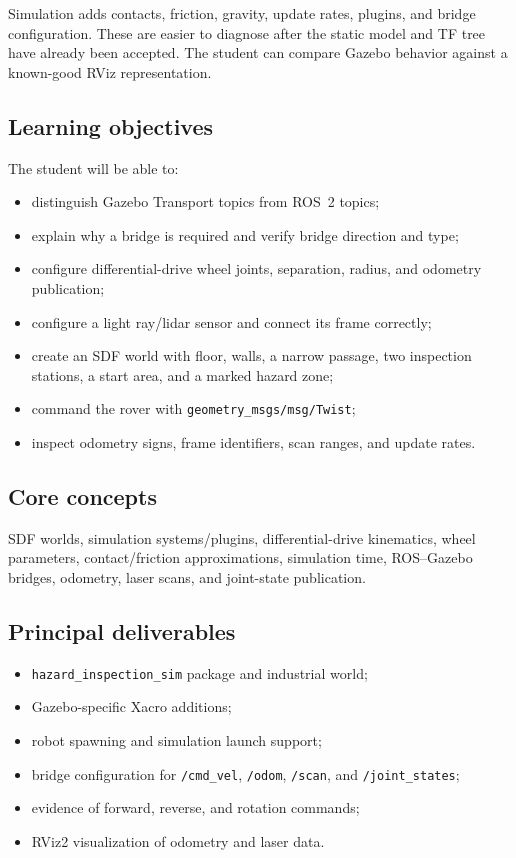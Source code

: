 \documentclass[11pt]{article}
\begin{document}
Simulation adds contacts, friction, gravity, update rates, plugins, and bridge
configuration. These are easier to diagnose after the static model and TF tree
have already been accepted. The student can compare Gazebo behavior against a
known-good RViz representation.

\subsection{Learning objectives}

The student will be able to:

\begin{itemize}
  \item distinguish Gazebo Transport topics from ROS~2 topics;
  \item explain why a bridge is required and verify bridge direction and type;
  \item configure differential-drive wheel joints, separation, radius, and
        odometry publication;
  \item configure a light ray/lidar sensor and connect its frame correctly;
  \item create an SDF world with floor, walls, a narrow passage, two inspection
        stations, a start area, and a marked hazard zone;
  \item command the rover with \texttt{geometry\_msgs/msg/Twist};
  \item inspect odometry signs, frame identifiers, scan ranges, and update rates.
\end{itemize}

\subsection{Core concepts}

SDF worlds, simulation systems/plugins, differential-drive kinematics, wheel
parameters, contact/friction approximations, simulation time, ROS--Gazebo
bridges, odometry, laser scans, and joint-state publication.

\subsection{Principal deliverables}

\begin{itemize}
  \item \texttt{hazard\_inspection\_sim} package and industrial world;
  \item Gazebo-specific Xacro additions;
  \item robot spawning and simulation launch support;
  \item bridge configuration for \texttt{/cmd\_vel}, \texttt{/odom},
        \texttt{/scan}, and \texttt{/joint\_states};
  \item evidence of forward, reverse, and rotation commands;
  \item RViz2 visualization of odometry and laser data.
\end{itemize}
\end{document}
